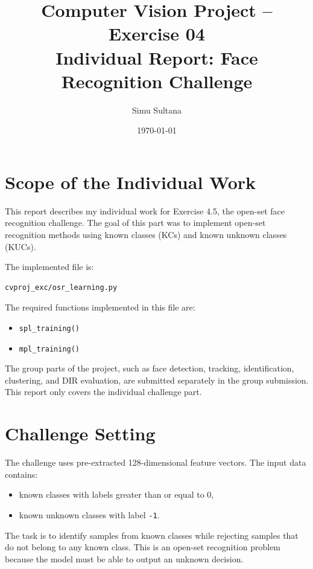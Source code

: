 \documentclass[11pt,a4paper]{article}
\title{\textbf{Computer Vision Project -- Exercise 04}\\Individual Report: Face Recognition Challenge}
\author{Simu Sultana}
\date{\today}
\begin{document}
\maketitle

\section{Scope of the Individual Work}

This report describes my individual work for Exercise 4.5, the open-set face recognition challenge. The goal of this part was to implement open-set recognition methods using known classes (KCs) and known unknown classes (KUCs).

The implemented file is:

\begin{lstlisting}
cvproj_exc/osr_learning.py
\end{lstlisting}

The required functions implemented in this file are:

\begin{itemize}[noitemsep]
    \item \texttt{spl\_training()}
    \item \texttt{mpl\_training()}
\end{itemize}

The group parts of the project, such as face detection, tracking, identification, clustering, and DIR evaluation, are submitted separately in the group submission. This report only covers the individual challenge part.

\section{Challenge Setting}

The challenge uses pre-extracted 128-dimensional feature vectors. The input data contains:

\begin{itemize}[noitemsep]
    \item known classes with labels greater than or equal to 0,
    \item known unknown classes with label \texttt{-1}.
\end{itemize}

The task is to identify samples from known classes while rejecting samples that do not belong to any known class. This is an open-set recognition problem because the model must be able to output an unknown decision.
\end{document}
